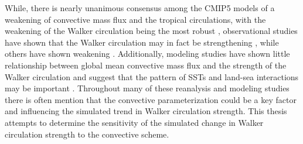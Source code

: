 \documentclass[letterpaper,12pt,titlepage,oneside,final]{book}
\begin{document}
While, there is nearly unanimous consensus among the CMIP5 models of a weakening of convective mass flux \citep{chadwick_spatial_2012} and the tropical circulations, with the weakening of the Walker circulation being the most robust \citep{he_anthropogenic_2015}, observational studies have shown that the Walker circulation may in fact be strengthening \citep{lheureux_recent_2013,sandeep_pacific_2014,sohn_role_2016}, while others have shown weakening \citep{vecchi_weakening_2006,power_what_2011}. Additionally, modeling studies have shown little relationship between global mean convective mass flux and the strength of the Walker circulation and suggest that the pattern of SSTs and land-sea interactions may be important \citep{sandeep_pacific_2014,li_strengthening_2015}. Throughout many of these reanalysis and modeling studies there is often mention that the convective parameterization could be a key factor and influencing the simulated trend in Walker circulation strength. This thesis attempts to determine the sensitivity of the simulated change in Walker circulation strength to the convective scheme.  
\end{document}
